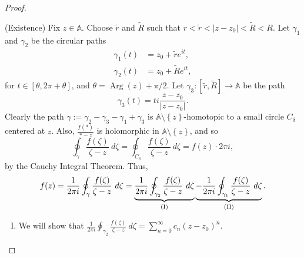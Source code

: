 \documentclass[12pt,openany]{book}
\theoremstyle{definition}
\newcommand{\set}[1]{\left\{#1\right\}}
\newcommand{\abs}[1]{\left\lvert #1 \right\rvert}
\newcommand{\Arg}{\operatorname{Arg}}
\begin{document}
\begin{proof}
\begin{center}
		\end{center}
		(Existence) Fix $z\in\mathbb{A}$. Choose $\tilde{r}$ and $\tilde{R}$ such that $r<\tilde{r}<\abs{z-z_0}<\tilde{R}<R$. Let $\gamma_1$ and $\gamma_2$ be the circular paths \begin{align*}
		\gamma_1(t)&=z_0+\tilde{r}e^{it},\\
		\gamma_2(t)&=z_0+\tilde{R}e^{it},
		\end{align*} for $t\in[\theta,2\pi+\theta]$, and $\theta=\Arg(z)+\pi/2$. Let $\gamma_3:[\tilde{r},\tilde{R}]\to\mathbb{A}$ be the path \[
		\gamma_3(t)=ti\frac{z-z_0}{\abs{z-z_0}}.
		\] Clearly the path $\gamma:=\gamma_2-\gamma_3-\gamma_1+\gamma_3$ is $\mathbb{A}\setminus\set{z}$-homotopic to a small circle $C_\delta$ centered at $z$. Also, $\frac{f(*)}{*-z}$ is holomorphic in $\mathbb{A}\setminus\set{z}$, and so \[
		\oint_\gamma\frac{f(\zeta)}{\zeta-z}\ d\zeta=\oint_{C_\delta}\frac{f(\zeta)}{\zeta-z}\ d\zeta=f(z)\cdot 2\pi i,
		\] by the Cauchy Integral Theorem. Thus, \[
		f(z)=\frac{1}{2\pi i}\oint_\gamma\frac{f(\zeta)}{\zeta-z}\ d\zeta=\underbrace{\frac{1}{2\pi i}\oint_{\gamma_2}\frac{f(\zeta)}{\zeta-z}\ d\zeta}_{\textnormal{(I)}}\underbrace{-\frac{1}{2\pi i}\oint_{\gamma_1}\frac{f(\zeta)}{\zeta-z}\ d\zeta}_{\textnormal{(II)}}.
		\]
		
		\begin{enumerate}[(I)]
			\item We will show that $\displaystyle\frac{1}{2\pi i}\oint_{\gamma_2}\frac{f(\zeta)}{\zeta-z}\ d\zeta=\sum_{n=0}^\infty c_n(z-z_0)^n$.
			

\end{enumerate}
\end{proof}
\end{document}
